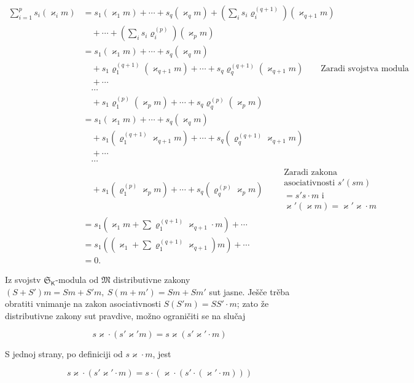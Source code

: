 \documentclass[11pt]{article}
\begin{document}
\[
\begin{aligned}
\sum_{i=1}^{p}s_i(\varkappa _i m)
&=s_1(\varkappa _1m)+\cdots+s_q(\varkappa _qm)
  +\left(\sum_i s_i\varrho_i^{(q+1)}\right)(\varkappa _{q+1}m)\\
&\quad+\cdots+\left(\sum_i s_i\varrho_i^{(p)}\right)(\varkappa _pm)\\
&=s_1(\varkappa _1m)+\cdots+s_q(\varkappa _qm)\\
&\quad+s_1\varrho_1^{(q+1)}(\varkappa _{q+1}m)+\cdots+s_q\varrho_q^{(q+1)}(\varkappa _{q+1}m)
  \qquad\text{Zaradi svojstva modula}\\
&\quad+\cdots\\
&\quad\cdots\\
&\quad+s_1\varrho_1^{(p)}(\varkappa _pm)+\cdots+s_q\varrho_q^{(p)}(\varkappa _pm)\\
&=s_1(\varkappa _1m)+\cdots+s_q(\varkappa _qm)\\
&\quad+s_1(\varrho_1^{(q+1)}\varkappa _{q+1}m)+\cdots+s_q(\varrho_q^{(q+1)}\varkappa _{q+1}m)\\
&\quad+\cdots\\
&\quad\cdots\\
&\quad+s_1(\varrho_1^{(p)}\varkappa _pm)+\cdots+s_q(\varrho_q^{(p)}\varkappa _pm)
  \qquad\begin{gathered}\text{Zaradi zakona}\\ \text{asociativnosti }s'(sm)\\ =s's\cdot m\text{ i}\\ \varkappa '(\varkappa m)=\varkappa '\varkappa \cdot m\end{gathered}\\
&=s_1\left(\varkappa _1m+\sum\varrho_1^{(q+1)}\varkappa _{q+1}\cdot m\right)+\cdots\\
&=s_1\left(\left(\varkappa _1+\sum\varrho_1^{(q+1)}\varkappa _{q+1}\right)m\right)+\cdots\\
&=0.
\end{aligned}
\]


Iz svojstv \(\mathfrak S_{\mathsf K}\)-modula od \(\mathfrak M\) distributivne zakony \((S+S')m=Sm+S'm,\ S(m+m')=Sm+Sm'\) sut jasne. Ješče trěba obratiti vnimanje na zakon asociativnosti \(S(S'm)=SS'\cdot m\); zato že distributivne zakony sut pravdive, možno ograničiti se na slučaj

\[
s\varkappa \cdot(s'\varkappa ' m)=s\varkappa (s'\varkappa '\cdot m)
\]

S jednoj strany, po definiciji od \(s\varkappa \cdot m\), jest

\[
s\varkappa \cdot(s'\varkappa '\cdot m)=s\cdot(\varkappa \cdot(s'\cdot(\varkappa '\cdot m)))
\]
\end{document}
